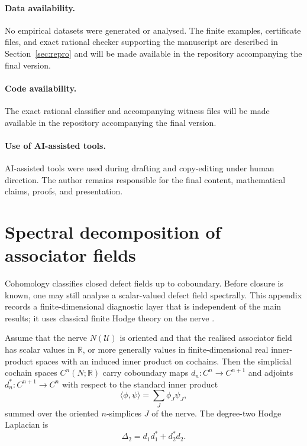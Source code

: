 \documentclass[11pt]{article}
\newcommand{\R}{\mathbb{R}}
\begin{document}
\paragraph{Data availability.}
No empirical datasets were generated or analysed. The finite examples, certificate files, and exact rational checker supporting the manuscript are described in Section~\ref{sec:repro} and will be made available in the repository accompanying the final version.

\paragraph{Code availability.}
The exact rational classifier and accompanying witness files will be made available in the repository accompanying the final version.

\paragraph{Use of AI-assisted tools.}
AI-assisted tools were used during drafting and copy-editing under human direction. The author remains responsible for the final content, mathematical claims, proofs, and presentation.

\appendix

\section{Spectral decomposition of associator fields}
\label{app:spectral}

Cohomology classifies closed defect fields up to coboundary. Before closure is known, one may still analyse a scalar-valued defect field spectrally. This appendix records a finite-dimensional diagnostic layer that is independent of the main results; it uses classical finite Hodge theory on the nerve \cite{Eckmann1944}.

Assume that the nerve \(N(\mathcal U)\) is oriented and that the realised associator field has scalar values in \(\R\), or more generally values in finite-dimensional real inner-product spaces with an induced inner product on cochains. Then the simplicial cochain spaces \(C^n(N;\R)\) carry coboundary maps \(d_n:C^n\to C^{n+1}\) and adjoints \(d_n^*:C^{n+1}\to C^n\) with respect to the standard inner product
\[
\langle \phi,\psi\rangle=\sum_J \phi_J\psi_J,
\]
summed over the oriented \(n\)-simplices \(J\) of the nerve. The degree-two Hodge Laplacian is
\[
\Delta_2=d_1d_1^*+d_2^*d_2.
\]
\end{document}
